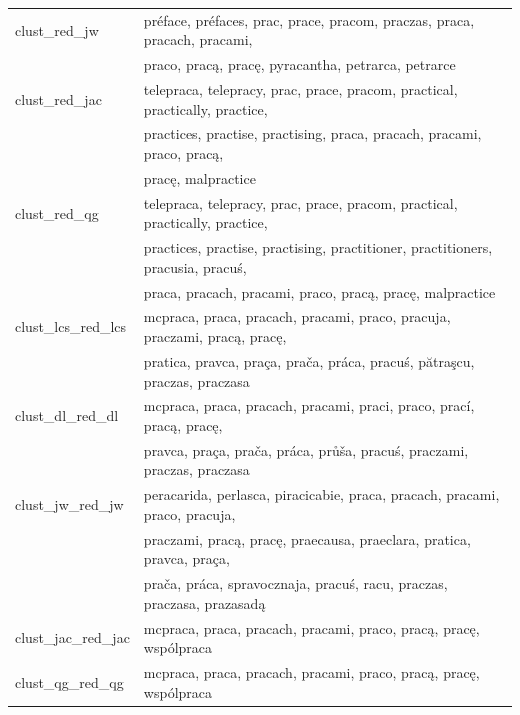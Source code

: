 \documentclass{praca1}
\begin{document}
\begin{table}[!h]
\begin{tabular}{|l|l|}
   \hline
clust\_red\_jw & préface, préfaces, prac, prace, pracom, praczas, praca, pracach, pracami, \\ &  praco, pracą, pracę, pyracantha, petrarca, petrarce \\ 
   \hline
clust\_red\_jac & telepraca, telepracy, prac, prace, pracom, practical, practically, practice,  \\ & practices, practise, practising, praca, pracach, pracami, praco, pracą,  \\ & pracę, malpractice \\ 
   \hline
clust\_red\_qg & telepraca, telepracy, prac, prace, pracom, practical, practically, practice, \\ &  practices, practise, practising, practitioner, practitioners, pracusia, pracuś,  \\ & praca, pracach, pracami, praco, pracą, pracę, malpractice \\ 
   \hline
clust\_lcs\_red\_lcs & mcpraca, praca, pracach, pracami, praco, pracuja, praczami, pracą, pracę,  \\ & pratica, pravca, praça, prača, práca, pracuś, pătraşcu, praczas, praczasa \\ 
   \hline
clust\_dl\_red\_dl & mcpraca, praca, pracach, pracami, praci, praco, prací, pracą, pracę,  \\ & pravca, praça, prača, práca, průša, pracuś, praczami, praczas, praczasa \\ 
   \hline
clust\_jw\_red\_jw & peracarida, perlasca, piracicabie, praca, pracach, pracami, praco, pracuja,  \\ & praczami, pracą, pracę, praecausa, praeclara, pratica, pravca, praça, \\ &  prača, práca, spravocznaja, pracuś, racu, praczas, praczasa, prazasadą \\ 
   \hline
clust\_jac\_red\_jac & mcpraca, praca, pracach, pracami, praco, pracą, pracę, wspólpraca \\ 
   \hline
clust\_qg\_red\_qg & mcpraca, praca, pracach, pracami, praco, pracą, pracę, wspólpraca \\ 
   \hline
\end{tabular}
\label{tab:006}
\end{table}
\end{document}
